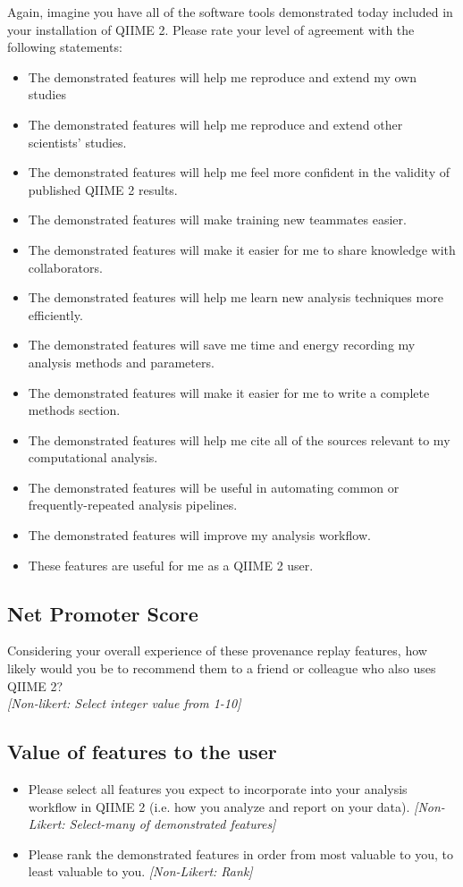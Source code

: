\noindent Again, imagine you have all of the software tools demonstrated today included in
your installation of QIIME 2.  Please rate your level of agreement with the
following statements:
\begin{itemize}
    \item The demonstrated features will help me reproduce and extend my own studies
    \item The demonstrated features will help me reproduce and extend other scientists’ studies.
    \item The demonstrated features will help me feel more confident in the validity of published QIIME 2 results.
    \item The demonstrated features will make training new teammates easier.
    \item The demonstrated features will make it easier for me to share knowledge with collaborators.
    \item The demonstrated features will help me learn new analysis techniques more efficiently.
    \item The demonstrated features will save me time and energy recording my analysis methods and parameters.
    \item The demonstrated features will make it easier for me to write a complete methods section.
    \item The demonstrated features will help me cite all of the sources relevant to my computational analysis.
    \item The demonstrated features will be useful in automating common or frequently-repeated analysis pipelines.
    \item The demonstrated features will improve my analysis workflow.
    \item These features are useful for me as a QIIME 2 user.
\end{itemize}

\subsection*{Net Promoter Score}

\noindent Considering your overall experience of these provenance replay features, how
likely would you be to recommend them to a friend or colleague who also uses
QIIME 2? \\
\emph{[Non-likert: Select integer value from 1-10]}

\subsection*{Value of features to the user}

\begin{itemize}
    \item Please select all features you expect to incorporate into your
    analysis workflow in QIIME 2 (i.e. how you analyze and report on your data).
    \emph{[Non-Likert: Select-many of demonstrated features]}
    \item Please rank the demonstrated features in order from most valuable to
    you, to least valuable to you. \emph{[Non-Likert: Rank]}
\end{itemize}

